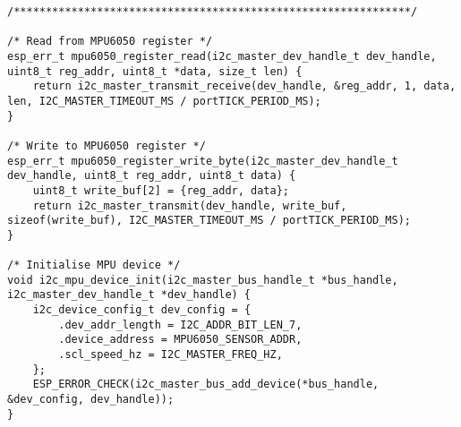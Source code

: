 \begin{lstlisting}[caption={Register Read}]
/**************************************************************/

/* Read from MPU6050 register */
esp_err_t mpu6050_register_read(i2c_master_dev_handle_t dev_handle, uint8_t reg_addr, uint8_t *data, size_t len) {
    return i2c_master_transmit_receive(dev_handle, &reg_addr, 1, data, len, I2C_MASTER_TIMEOUT_MS / portTICK_PERIOD_MS);
}

/* Write to MPU6050 register */
esp_err_t mpu6050_register_write_byte(i2c_master_dev_handle_t dev_handle, uint8_t reg_addr, uint8_t data) {
    uint8_t write_buf[2] = {reg_addr, data};
    return i2c_master_transmit(dev_handle, write_buf, sizeof(write_buf), I2C_MASTER_TIMEOUT_MS / portTICK_PERIOD_MS);
}

/* Initialise MPU device */
void i2c_mpu_device_init(i2c_master_bus_handle_t *bus_handle, i2c_master_dev_handle_t *dev_handle) {
    i2c_device_config_t dev_config = {
        .dev_addr_length = I2C_ADDR_BIT_LEN_7,
        .device_address = MPU6050_SENSOR_ADDR,
        .scl_speed_hz = I2C_MASTER_FREQ_HZ,
    };
    ESP_ERROR_CHECK(i2c_master_bus_add_device(*bus_handle, &dev_config, dev_handle));
}
\end{lstlisting}
